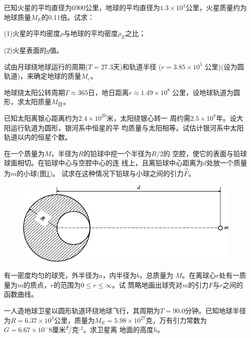 \begin{exercises}
\exercise 已知火星的平均直径为6900公里，地球的平均直径为$ 1.3
  \times 1 0 ^ { 4 }   $公里，火星质量约为地球质量$  M _ { E }   $的0.11倍。试求：

(1)火星的平均密度$\rho$与地球的平均密度$ \rho _ E $之比；

(2)火星表面的$ g $值。

\exercise 试由月球绕地球运行的周期($  T = 2 7 . 3   $天)和轨道半径
($  r = 3 . 8 5 \times 1 0 ^ { 5 } $ 公里)(设为圆轨道)，来确定地球的质量$ M _ e $。

\exercise 地球绕太阳公转周期$  T \approx 3 6 5   $日，地日距离$  r \approx 1 . 4 9 \times 1 0 ^ { 8 }  $
公里，设地球轨道为圆形，求太阳质量$ M _ \text{日} $。

\exercise 已知太阳离银心距离约为$  2 . 4 \times 1 0 ^ { 2 0 }   $米，太阳绕银心转一
周约需$  2 . 5 \times 1 0 ^ { 8 }   $年。设大阳运行轨道为圆形，银河系中恒星的平
均质量与太阳相等。试估计银河系中太阳轨道以内的恒星个数。

\exercise 在一个质量为$ M $，半径为$ R $的铅球中挖一个半径为$ R/2 $的
空腔，使它的表面与铅球球面相切。在铅球中心与空腔中心的连
线上，且离铅球中心距离为$ d $处放一个质量为$ m $的小球(图\ref{fig:04.12})。
试求在这种情况下铅球与小球之间的引力$ \vec{F} $。
\begin{figure}[h]
  \centering
  \includegraphics{figure/fig04.12}
  \caption{}
  \label{fig:04.12}
\end{figure}

\exercise 有一密度均匀的球壳，外半径为$ a $，内半径为$ b $，总质量为
$ M $。在离球心$ r $处有一质量为$ m $的质点，$ r $的范围为$  0 \leqslant r \leqslant \infty   $。试
筒略地画出球壳对$ m $的引力$ F $与$ r $之间的函数曲线。

\exercise 一人造地球卫星以圆形轨道环绕地球飞行，其周期为$  T =
  90.0 $分钟。已知地球半径为$  R = 6. 3 7 \times 1 0 ^ { 3 }   $公里，质量为$  M _ { E } = 5 . 9 8
  \times 1 0 ^ { 2 7 }   $克，万有引力常数为$  G = 6 . 6 7 \times 1 0 ^ { - }  8 $厘米\.$ ^3 $/克$ \cdot $\.$ ^2 $。求卫星离
地面的高度$ h $。


\end{exercises}

